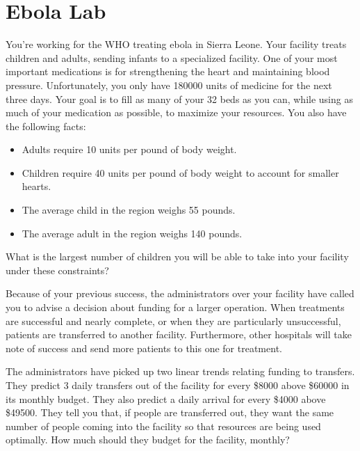 \pagestyle{plain}
\section*{Ebola Lab}

\begin{exercise}
You're working for the WHO treating ebola in Sierra Leone.  Your facility treats children and adults, sending infants to a specialized facility.  One of your most important medications is for strengthening the heart and maintaining blood pressure.  Unfortunately, you only have 180000 units of medicine for the next three days.  Your goal is to fill as many of your 32 beds as you can, while using as much of your medication as possible, to maximize your resources.  You also have the following facts:

\begin{itemize}
\item Adults require 10 units per pound of body weight.
\item Children require 40 units per pound of body weight to account for smaller hearts.
\item The average child in the region weighs 55 pounds.
\item The average adult in the region weighs 140 pounds.
\end{itemize}

What is the largest number of children you will be able to take into your facility under these constraints?

\end{exercise}
\bigskip

\begin{exercise}
Because of your previous success, the administrators over your facility have called you to advise a decision about funding for a larger operation.  When treatments are successful and nearly complete, or when they are particularly unsuccessful, patients are transferred to another facility.  Furthermore, other hospitals will take note of success and send more patients to this one for treatment.

The administrators have picked up two linear trends relating funding to transfers.  They predict 3 daily transfers out of the facility for every \$8000 above \$60000 in its monthly budget.  They also predict a daily arrival for every \$4000 above \$49500.  They tell you that, if people are transferred out, they want the same number of people coming into the facility so that resources are being used optimally.  How much should they budget for the facility, monthly?

\end{exercise}
\bigskip